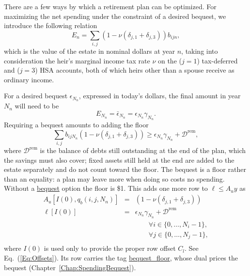 \documentclass[fleqn,12pt]{report}
\newcommand{\code}[1]{\url{#1}}
\begin{document}
There are a few ways by which a retirement plan can be optimized. For maximizing the net spending under
the constraint of a desired bequest, we introduce the following relation
\begin{equation}
	\label{Eq:Bequest}
	E_n = \sum_{i,j} (1 - \nu(\delta_{j, 1} + \delta_{j, 3})) b_{ijn},
\end{equation}
which is the value of the estate in nominal dollars at year $n$,
taking into consideration the heir's marginal income tax rate $\nu$ on the ($j=1$) tax-deferred
and ($j=3$) HSA accounts, both of which heirs other than a spouse receive as ordinary income.

For a desired bequest $\epsilon_{N_n}$, expressed in today's
dollars, the final amount in year $N_n$ will need to be
\begin{equation}
	E_{N_n} = \bar\epsilon_{N_n} = \epsilon_{N_n} \gamma_{N_n}.
\end{equation}
Requiring a bequest amounts to adding the floor
\begin{equation}
	\label{Eq:BequestFloor}
	\sum_{i,j} b_{ijN_n} (1 - \nu(\delta_{j, 1} + \delta_{j, 3})) \ge \epsilon_{N_n} \gamma_{N_n} + \mathcal{D}^{\mathrm{rem}},
\end{equation}
where $\mathcal{D}^{\mathrm{rem}}$ is the balance of debts still outstanding at the end of the
plan, which the savings must also cover; fixed assets still held at the end are added to the
estate separately and do not count toward the floor.
The bequest is a floor rather than an equality: a plan may leave more when doing so costs no
spending.
Without a \code{bequest} option the floor is \$1.
This adds one more row to $\ell \le A_uy$ as
\begin{eqnarray}
	A_u[I(0), q_b(i, j, N_n)] &=& (1 - \nu(\delta_{j, 1} + \delta_{j, 3})) \nonumber \\
	\ell[I(0)] &=& \epsilon_{N_n}\gamma_{N_n} + \mathcal{D}^{\mathrm{rem}} \\
	&&\qquad\forall i \in \{0,\ldots, N_i-1\},\nonumber\\
	&&\qquad\forall j \in \{0,\ldots, N_j-1\},\nonumber\\
\end{eqnarray}
where $I(0)$ is used only to provide the proper row offset $C_l$. See Eq.~(\ref{Eq:Offsets}).
Its row carries the tag \code{bequest_floor}, whose dual prices the bequest
(Chapter~\ref{Chap:SpendingBequest}).
\end{document}
